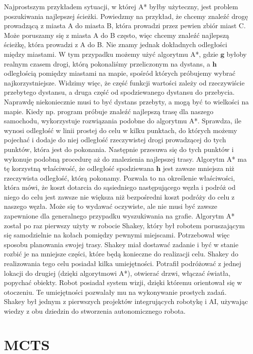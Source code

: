 Najprostszym przykładem sytuacji, w której A* byłby użyteczny, jest problem poszukiwania najlepszej ścieżki. Powiedzmy na przykład, że chcemy znaleźć drogę prowadzącą z miasta A do miasta B, która prowadzi przez pewien zbiór miast C. Może poruszamy się z miasta A do B często, więc chcemy znaleźć najlepszą ścieżkę, która prowadzi z A do B. Nie znamy jednak dokładnych odległości między miastami. W tym przypadku możemy użyć algorytmu A*, gdzie $\boldsymbol{g}$ byłoby realnym czasem drogi, którą pokonaliśmy przeliczonym na dystans, a $\boldsymbol{h}$ odległością pomiędzy miastami na mapie, spośród których próbujemy wybrać najkorzystniejsze. Widzimy więc, że część funkcji wartości zależy od rzeczywiście przebytego dystansu, a druga część od spodziewanego dystansu do przebycia. Naprawdę niekoniecznie musi to być dystans przebyty, a mogą być to wielkości na mapie. Kiedy np. program próbuje znaleźć najlepszą trasę dla naszego samochodu, wykorzystuje rozwiązania podobne do algorytmu A*. Sprawdza, ile wynosi odległość w linii prostej do celu w kilku punktach, do których możemy pojechać i dodaje do niej odległość rzeczywistej drogi prowadzącej do tych punktów, która jest do pokonania. Następnie przesuwa się do tych punktów i wykonuje podobną procedurę aż do znalezienia najlepszej trasy. Algorytm A* ma tę korzystną właściwość, że odległość spodziewana $\boldsymbol{h}$ jest zawsze mniejsza niż rzeczywista odległość, którą pokonamy. Pozwala to na określenie właściwości, która mówi, że koszt dotarcia do sąsiedniego następującego węzła i podróż od niego do celu jest zawsze nie większa niż bezpośredni koszt podróży do celu z naszego węzła. Może się to wydawać oczywiste, ale nie musi być zawsze zapewnione dla generalnego przypadku wyszukiwania na grafie. Algorytm A* został po raz pierwszy użyty w robocie Shakey, który był robotem poruszającym się samodzielnie na kołach pomiędzy pewnymi miejscami. Potrzebował więc sposobu planowania swojej trasy. Shakey miał dostawać zadanie i być w stanie rozbić je na mniejsze części, które będą konieczne do realizacji celu. Shakey do realizowania tego celu posiadał kilka umiejętności. Potrafił podróżować z jednej lokacji do drugiej (dzięki algorytmowi A*), otwierać drzwi, włączać światła, popychać obiekty. Robot posiadał system wizji, dzięki któremu orientował się w otoczeniu. Te umiejętności pozwalały mu na wykonywanie prostych zadań. Shakey był jednym z pierwszych projektów integrujących robotykę i AI, używając wiedzy z obu dziedzin do stworzenia autonomicznego robota.

\section{MCTS}

